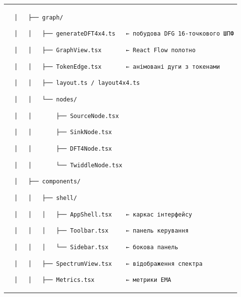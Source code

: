 \documentclass[
]{article}
\newcommand{\passthrough}[1]{#1}
\begin{document}
{\begin{longtable}[]{@{}
  >{\raggedright\arraybackslash}p{}@{}}
\passthrough{\lstinline!  │   ├── graph/!}

\passthrough{\lstinline!  │   │   ├── generateDFT4x4.ts   ← !}\passthrough{\lstinline!побудова!}\passthrough{\lstinline! DFG 16-точкового ШПФ!}

\passthrough{\lstinline!  │   │   ├── !}\passthrough{\lstinline!GraphView.tsx!}\passthrough{\lstinline!       ← React Flow !}\passthrough{\lstinline!полотно!}

\passthrough{\lstinline!  │   │   ├── !}\passthrough{\lstinline!TokenEdge.tsx!}\passthrough{\lstinline!       ← !}\passthrough{\lstinline!анімовані!}\passthrough{\lstinline! !}\passthrough{\lstinline!дуги!}\passthrough{\lstinline! з !}\passthrough{\lstinline!токенами!}

\passthrough{\lstinline!  │   │   ├── !}\passthrough{\lstinline!layout.ts!}\passthrough{\lstinline! / layout4x4.ts!}

\passthrough{\lstinline!  │   │   └── nodes/!}

\passthrough{\lstinline!  │   │       ├── !}\passthrough{\lstinline!SourceNode.tsx!}

\passthrough{\lstinline!  │   │       ├── !}\passthrough{\lstinline!SinkNode.tsx!}

\passthrough{\lstinline!  │   │       ├── DFT4Node.tsx!}

\passthrough{\lstinline!  │   │       └── !}\passthrough{\lstinline!TwiddleNode.tsx!}

\passthrough{\lstinline!  │   ├── components/!}

\passthrough{\lstinline!  │   │   ├── shell/!}

\passthrough{\lstinline!  │   │   │   ├── !}\passthrough{\lstinline!AppShell.tsx!}\passthrough{\lstinline!    ← !}\passthrough{\lstinline!каркас!}\passthrough{\lstinline! !}\passthrough{\lstinline!інтерфейсу!}

\passthrough{\lstinline!  │   │   │   ├── !}\passthrough{\lstinline!Toolbar.tsx!}\passthrough{\lstinline!     ← !}\passthrough{\lstinline!панель!}\passthrough{\lstinline! керування!}

\passthrough{\lstinline!  │   │   │   └── !}\passthrough{\lstinline!Sidebar.tsx!}\passthrough{\lstinline!     ← !}\passthrough{\lstinline!бокова!}\passthrough{\lstinline! !}\passthrough{\lstinline!панель!}

\passthrough{\lstinline!  │   │   ├── !}\passthrough{\lstinline!SpectrumView.tsx!}\passthrough{\lstinline!    ← відображення спектра!}

\passthrough{\lstinline!  │   │   ├── !}\passthrough{\lstinline!Metrics.tsx!}\passthrough{\lstinline!         ← !}\passthrough{\lstinline!метрики!}\passthrough{\lstinline! EMA!}


\end{longtable}}
\end{document}
